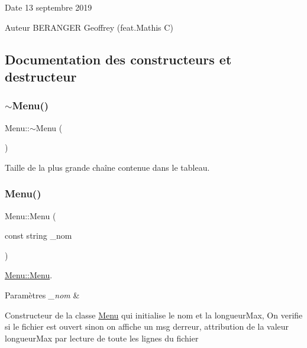 \begin{DoxyDate}{Date}
13 septembre 2019 
\end{DoxyDate}
\begin{DoxyAuthor}{Auteur}
B\+E\+R\+A\+N\+G\+ER Geoffrey (feat.\+Mathis C) 
\end{DoxyAuthor}


\subsection{Documentation des constructeurs et destructeur}
\mbox{\label{class_menu_a831387f51358cfb88cd018e1777bc980}} 
\subsubsection{\texorpdfstring{$\sim$\+Menu()}{~Menu()}}
{\footnotesize\ttfamily Menu\+::$\sim$\+Menu (\begin{DoxyParamCaption}{ }\end{DoxyParamCaption})}



Taille de la plus grande chaîne contenue dans le tableau. 

\mbox{\label{class_menu_a3ec2bde9fc4dfdf5d4e8afcc562fd58f}} 
\subsubsection{\texorpdfstring{Menu()}{Menu()}}
{\footnotesize\ttfamily Menu\+::\+Menu (\begin{DoxyParamCaption}\item[{const string}]{\+\_\+nom }\end{DoxyParamCaption})}



\hyperlink{class_menu_a3ec2bde9fc4dfdf5d4e8afcc562fd58f}{Menu\+::\+Menu}. 


\begin{DoxyParams}{Paramètres}
{\em \+\_\+nom} & \\
\hline
\end{DoxyParams}
Constructeur de la classe \hyperlink{class_menu}{Menu} qui initialise le nom et la longueur\+Max, On verifie si le fichier est ouvert sinon on affiche un msg d\textquotesingle{}erreur, attribution de la valeur longueur\+Max par lecture de toute les lignes du fichier 

